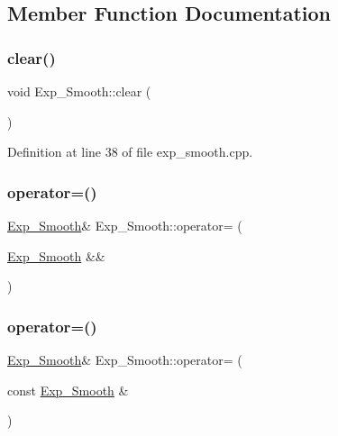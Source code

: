\subsection{Member Function Documentation}
\mbox{\label{class_exp___smooth_a3362788db2595048d3fc90622a7c1340}} 
\subsubsection{\texorpdfstring{clear()}{clear()}}
{\footnotesize\ttfamily void Exp\+\_\+\+Smooth\+::clear (\begin{DoxyParamCaption}{ }\end{DoxyParamCaption})}



Definition at line 38 of file exp\+\_\+smooth.\+cpp.

\mbox{\label{class_exp___smooth_a8d1aa6ab0c0e249815157a30beab2e08}} 
\subsubsection{\texorpdfstring{operator=()}{operator=()}\hspace{0.1cm}{\footnotesize\ttfamily [1/2]}}
{\footnotesize\ttfamily \mbox{\hyperlink{class_exp___smooth}{Exp\+\_\+\+Smooth}}\& Exp\+\_\+\+Smooth\+::operator= (\begin{DoxyParamCaption}\item[{\mbox{\hyperlink{class_exp___smooth}{Exp\+\_\+\+Smooth}} \&\&}]{ }\end{DoxyParamCaption})\hspace{0.3cm}{\ttfamily [default]}}

\mbox{\label{class_exp___smooth_a85aa3470f7947c594dde0706260e3eea}} 
\subsubsection{\texorpdfstring{operator=()}{operator=()}\hspace{0.1cm}{\footnotesize\ttfamily [2/2]}}
{\footnotesize\ttfamily \mbox{\hyperlink{class_exp___smooth}{Exp\+\_\+\+Smooth}}\& Exp\+\_\+\+Smooth\+::operator= (\begin{DoxyParamCaption}\item[{const \mbox{\hyperlink{class_exp___smooth}{Exp\+\_\+\+Smooth}} \&}]{ }\end{DoxyParamCaption})\hspace{0.3cm}{\ttfamily [default]}}

